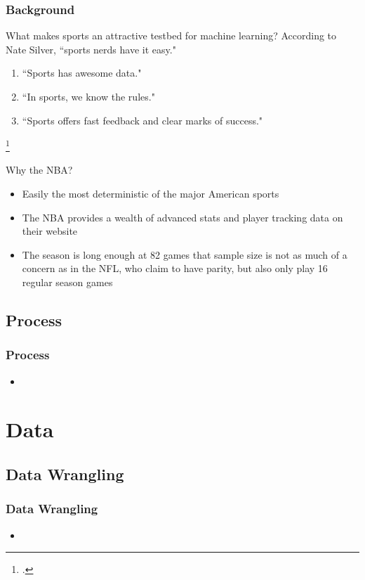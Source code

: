 \documentclass{beamer}
\begin{document}
\begin{frame}
\frametitle{Background}
\begin{block}{What makes sports an attractive testbed for machine learning?}
According to Nate Silver, ``sports nerds have it easy."\footnotemark
\begin{enumerate}
    \item ``Sports has awesome data."
    \item ``In sports, we know the rules."
    \item ``Sports offers fast feedback and clear marks of success."
\end{enumerate}
\end{block}
\footcitetext{silver-online}
\vspace{-0.5cm}
\begin{block}{Why the NBA?}
\begin{itemize}
    \item Easily the most deterministic of the major American sports
    \item The NBA provides a wealth of advanced stats and player tracking data on their website
    \item The season is long enough at 82 games that sample size is not as much of a concern as in the NFL, who claim to have parity, but also only play 16 regular season games
\end{itemize}
\end{block}
\end{frame}

\subsection{Process}
\begin{frame}
\frametitle{Process}
\begin{itemize}
    \item
\end{itemize}
\end{frame}

\section{Data}

\subsection{Data Wrangling}
\begin{frame}
\frametitle{Data Wrangling}
\begin{itemize}
    \item
\end{itemize}
\end{frame}
\end{document}
